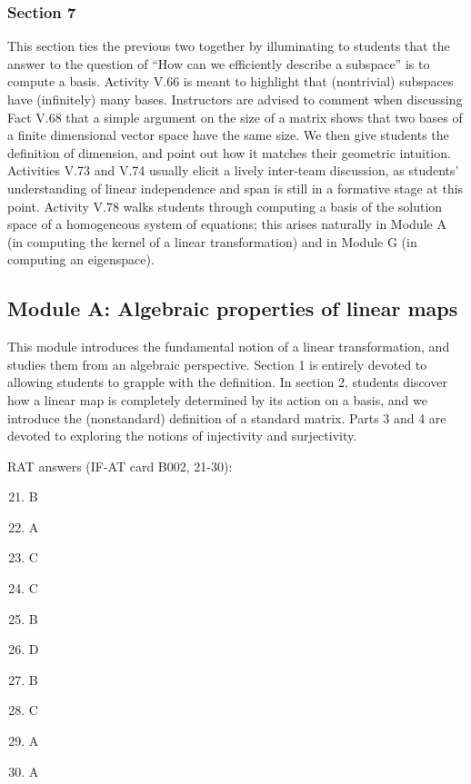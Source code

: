 \documentclass{article}
\begin{document}
\subsubsection*{Section 7}
This section ties the previous two together by illuminating to students that the answer to the question of ``How can we efficiently describe a subspace'' is to compute a basis.  Activity V.66 is meant to highlight that (nontrivial) subspaces have (infinitely) many bases.  Instructors are advised to comment when discussing Fact V.68 that a simple argument on the size of a matrix shows that two bases of a finite dimensional vector space have the same size.  We then give students the definition of dimension, and point out how it matches their geometric intuition.  Activities V.73 and V.74 usually elicit a lively inter-team discussion, as students' understanding of linear independence and span is still in a formative stage at this point.  Activity V.78 walks students through computing a basis of the solution space of a homogeneous system of equations; this arises naturally in Module A (in computing the kernel of a linear transformation) and in Module G (in computing an eigenspace).  

\subsection*{Module A: Algebraic properties of linear maps}
This module introduces the fundamental notion of a linear transformation, and studies them from an algebraic perspective.   Section 1 is entirely devoted to allowing students to grapple with the definition.  In section 2, students discover how a linear map is completely determined by its action on a basis, and we introduce the (nonstandard) definition of a standard matrix.  Parts 3 and 4 are devoted to exploring the notions of injectivity and surjectivity.

RAT answers (IF-AT card B002, 21-30):
\begin{multicols}{10}
\begin{enumerate}[1)]
\setcounter{enumi}{20}
\item B
\item A
\item C
\item C
\item B
\item D
\item B
\item C
\item A
\item A
\end{enumerate}
\end{multicols}
\end{document}
